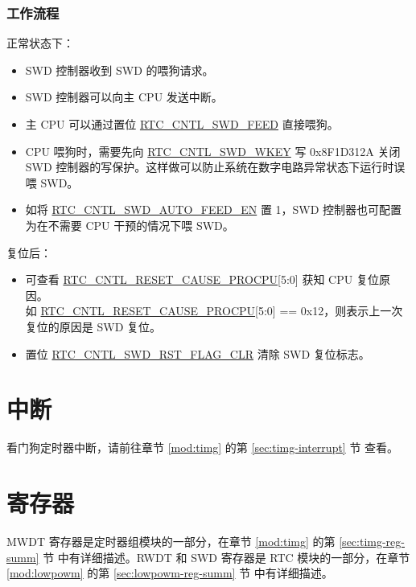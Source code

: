 \documentclass[main\_\_CN.tex]{subfiles}
\begin{document}
\subsubsection{工作流程}
正常状态下：
\begin{itemize}
    \item SWD 控制器收到 SWD 的喂狗请求。
    \item SWD 控制器可以向主 CPU 发送中断。
    \item 主 CPU 可以通过置位 \hyperref[fielddesc:RTCCNTLSWDFEED]{RTC\_CNTL\_SWD\_FEED} 直接喂狗。
    \item CPU 喂狗时，需要先向 \hyperref[fielddesc:RTCCNTLSWDWKEY]{RTC\_CNTL\_SWD\_WKEY} 写 0x8F1D312A  关闭 SWD 控制器的写保护。这样做可以防止系统在数字电路异常状态下运行时误喂 SWD。
    \item 如将 \hyperref[fielddesc:RTCCNTLSWDAUTOFEEDEN]{RTC\_CNTL\_SWD\_AUTO\_FEED\_EN} 置 1，SWD 控制器也可配置为在不需要 CPU 干预的情况下喂 SWD。
\end{itemize}

复位后：
\begin{itemize}
    \item 可查看 \hyperref[fielddesc:RTCCNTLRESETCAUSEPROCPU]{RTC\_CNTL\_RESET\_CAUSE\_PROCPU}[5:0] 获知 CPU 复位原因。\\
	如 \hyperref[fielddesc:RTCCNTLRESETCAUSEPROCPU]{RTC\_CNTL\_RESET\_CAUSE\_PROCPU}[5:0] == 0x12，则表示上一次复位的原因是 SWD 复位。
	\item 置位 \hyperref[fielddesc:RTCCNTLSWDRSTFLAGCLR]{RTC\_CNTL\_SWD\_RST\_FLAG\_CLR} 清除 SWD 复位标志。
\end{itemize}

\section{中断}

看门狗定时器中断，请前往章节 \ref{mod:timg} \textit{} 的第 \ref{sec:timg-interrupt} 节 \textit{} 查看。



\section{寄存器}
MWDT 寄存器是定时器组模块的一部分，在章节 \ref{mod:timg} \textit{} 的第 \ref{sec:timg-reg-summ} 节 \textit{} 中有详细描述。RWDT 和 SWD 寄存器是 RTC 模块的一部分，在章节 \ref{mod:lowpowm} \textit{} 的第 \ref{sec:lowpowm-reg-summ} 节 \textit{} 中有详细描述。
\end{document}
